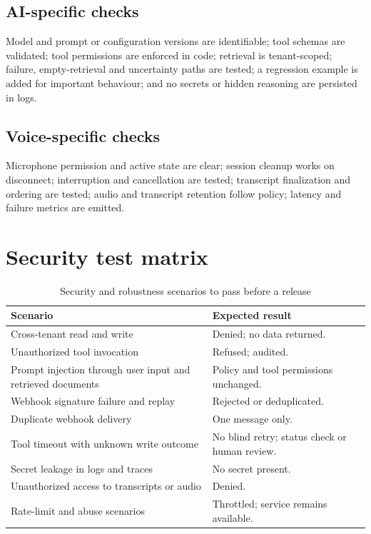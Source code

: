 \subsection{AI-specific checks}
Model and prompt or configuration versions are identifiable; tool schemas are validated; tool permissions are enforced in code; retrieval is tenant-scoped; failure, empty-retrieval and uncertainty paths are tested; a regression example is added for important behaviour; and no secrets or hidden reasoning are persisted in logs.

\subsection{Voice-specific checks}
Microphone permission and active state are clear; session cleanup works on disconnect; interruption and cancellation are tested; transcript finalization and ordering are tested; audio and transcript retention follow policy; latency and failure metrics are emitted.

\section{Security test matrix}\label{sec:sectests}
\begin{table}[htbp]
\centering\caption{Security and robustness scenarios to pass before a release}\label{tab:sectests}
\begin{tabular}{@{}p{6.4cm}p{9.6cm}@{}}
\toprule \textbf{Scenario} & \textbf{Expected result} \\ \midrule
Cross-tenant read and write & Denied; no data returned. \\
Unauthorized tool invocation & Refused; audited. \\
Prompt injection through user input and retrieved documents & Policy and tool permissions unchanged. \\
Webhook signature failure and replay & Rejected or deduplicated. \\
Duplicate webhook delivery & One message only. \\
Tool timeout with unknown write outcome & No blind retry; status check or human review. \\
Secret leakage in logs and traces & No secret present. \\
Unauthorized access to transcripts or audio & Denied. \\
Rate-limit and abuse scenarios & Throttled; service remains available. \\
\bottomrule
\end{tabular}
\end{table}


